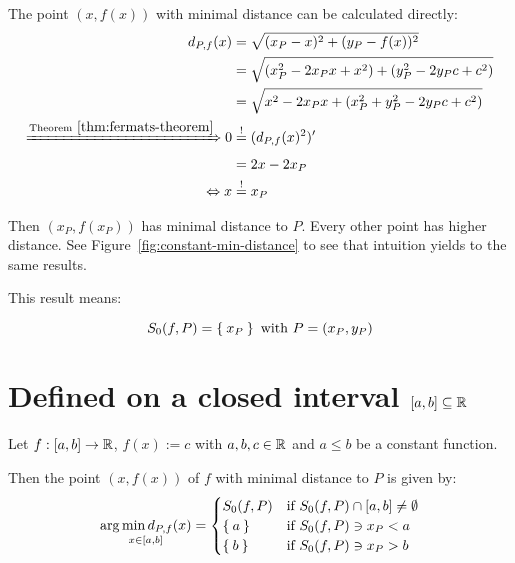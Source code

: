 The point $(x, f(x))$ with minimal distance can be calculated directly:
\begin{align}
    d_{P,f}(x) &= \sqrt{(x_P - x)^2 + (y_P - f(x))^2}\\
               &= \sqrt{(x_P^2 - 2x_P x + x^2) + (y_P^2 - 2 y_P c + c^2)} \\
               &= \sqrt{x^2 - 2 x_P x + (x_P^2 + y_P^2 - 2 y_P c + c^2)}\label{eq:constant-function-distance}\\
 \xRightarrow{\text{Theorem}~\ref{thm:fermats-theorem}} 0 &\stackrel{!}{=} (d_{P,f}(x)^2)'\\
              &= 2x - 2x_P\\
  \Leftrightarrow x &\stackrel{!}{=} x_P
\end{align}

Then $(x_P,f(x_P))$ has
minimal distance to $P$. Every other point has higher distance.
See Figure~\ref{fig:constant-min-distance} to see that intuition
yields to the same results.

This result means:

\[S_0(f, P) = \Set{x_P} \text{ with } P = (x_P, y_P)\]
\clearpage

\section{Defined on a closed interval $[a,b] \subseteq \mathbb{R}$}
\begin{theorem}
Let $f:[a,b] \rightarrow \mathbb{R}$, $f(x) := c$ with $a,b,c \in \mathbb{R}$ and 
$a \leq b$ be a constant function. 

Then the point $(x, f(x))$ of $f$ with minimal distance to $P$ is
given by:
\[\underset{x\in [a,b]}{\arg \min d_{P,f}(x)} = \begin{cases}
 S_0(f,P) &\text{if } S_0(f,P) \cap [a,b] \neq \emptyset \\
  \Set{a} &\text{if } S_0(f,P) \ni x_P < a\\
  \Set{b} &\text{if } S_0(f,P) \ni x_P > b
    \end{cases}\]
\end{theorem}

